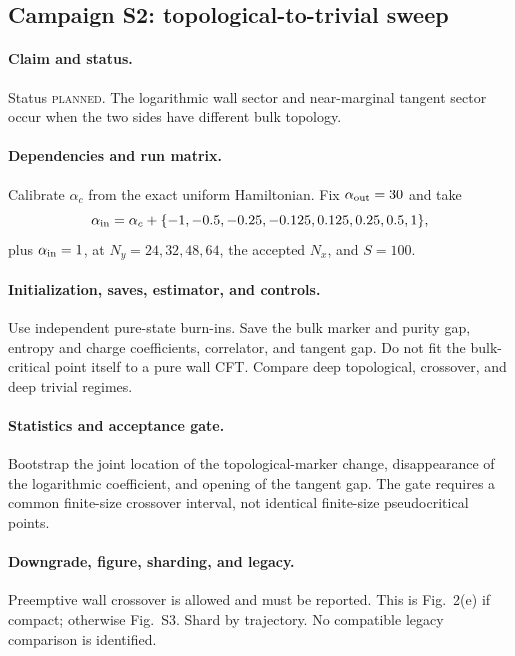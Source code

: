 \documentclass[aps,prx,onecolumn,nofootinbib,superscriptaddress,longbibliography]{revtex4-2}
\newcommand{\planned}{\textsc{planned}}
\begin{document}
\subsection{Campaign S2: topological-to-trivial sweep}
\paragraph{Claim and status.}
Status \planned.  The logarithmic wall sector and near-marginal tangent sector occur when
the two sides have different bulk topology.

\paragraph{Dependencies and run matrix.}
Calibrate $\alpha_c$ from the exact uniform Hamiltonian.  Fix
$\alpha_{\rm out}=30$ and take
\begin{equation}
 \alpha_{\rm in}=\alpha_c+\{-1,-0.5,-0.25,-0.125,0.125,0.25,0.5,1\},
\end{equation}
plus $\alpha_{\rm in}=1$, at $N_y=24,32,48,64$, the accepted $N_x$, and $S=100$.

\paragraph{Initialization, saves, estimator, and controls.}
Use independent pure-state burn-ins.  Save the bulk marker and purity gap, entropy and charge
coefficients, correlator, and tangent gap.  Do not fit the bulk-critical point itself to a
pure wall CFT.  Compare deep topological, crossover, and deep trivial regimes.

\paragraph{Statistics and acceptance gate.}
Bootstrap the joint location of the topological-marker change, disappearance of the
logarithmic coefficient, and opening of the tangent gap.  The gate requires a common
finite-size crossover interval, not identical finite-size pseudocritical points.

\paragraph{Downgrade, figure, sharding, and legacy.}
Preemptive wall crossover is allowed and must be reported.  This is Fig.~2(e) if compact;
otherwise Fig.~S3.  Shard by trajectory.  No compatible legacy comparison is identified.
\end{document}
